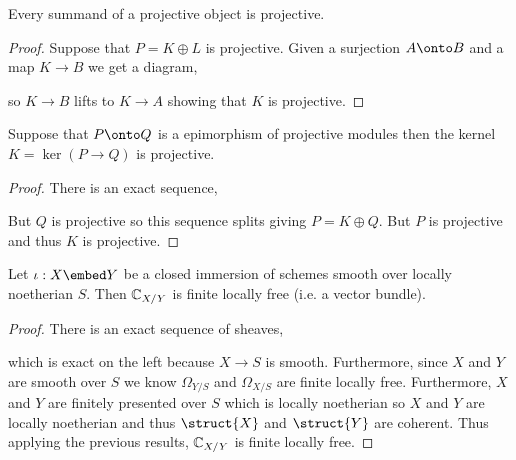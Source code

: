 \documentclass[12pt]{article}
\begin{document}
\begin{lemma}
Every summand of a projective object is projective. 
\end{lemma}

\begin{proof}
Suppose that $P = K \oplus L$ is projective. Given a surjection $A \onto B$ and a map $K \to B$ we get a diagram,
\begin{center}
\end{center}
so $K \to B$ lifts to $K \to A$ showing that $K$ is projective.
\end{proof}

\begin{cor}
Suppose that $P \onto Q$ is a epimorphism of projective modules then the kernel $K = \ker{(P \to Q)}$ is projective.
\end{cor}

\begin{proof}
There is an exact sequence,
\begin{center}
\end{center}
But $Q$ is projective so this sequence splits giving $P = K \oplus Q$. But $P$ is projective and thus $K$ is projective.
\end{proof}

\begin{prop}
Let $\iota : X \embed Y$ be a closed immersion of schemes smooth over locally noetherian $S$. Then $\mathbb{C}_{X/Y}$ is finite locally free (i.e. a vector bundle).
\end{prop}

\begin{proof}
There is an exact sequence of sheaves,
\begin{center}
\end{center}
which is exact on the left because $X \to S$ is smooth. Furthermore, since $X$ and $Y$ are smooth over $S$ we know $\Omega_{Y/S}$ and $\Omega_{X/S}$ are finite locally free. Furthermore, $X$ and $Y$ are finitely presented over $S$ which is locally noetherian so $X$ and $Y$ are locally noetherian and thus $\struct{X}$ and $\struct{Y}$ are coherent. Thus applying the previous results, $\mathbb{C}_{X/Y}$ is finite locally free.
\end{proof}
\end{document}
